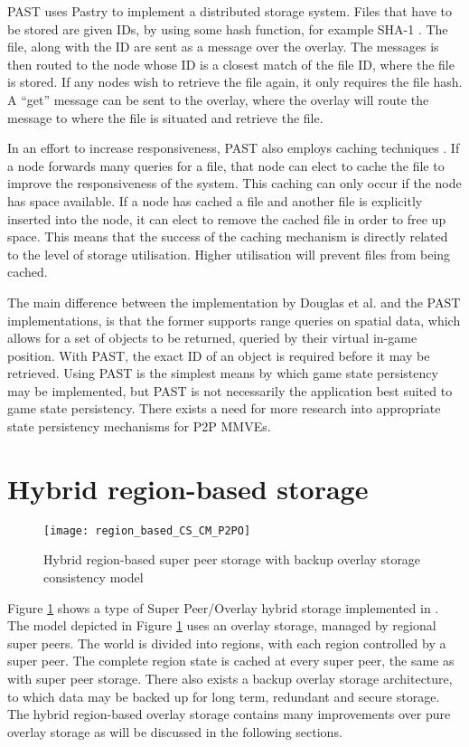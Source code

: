 PAST \cite{PAST_storage} uses Pastry to implement a distributed storage system. Files that have to be stored are given IDs, by using some hash
function, for example SHA-1 \cite{SHA}. The file, along with the ID are sent as a message over the overlay. The messages is then routed to the node
whose ID is a closest match of the file ID, where the file is stored. If any nodes wish to retrieve the file again, it only requires the file hash. A
``get'' message can be sent to the overlay, where the overlay will route the message to where the file is situated and retrieve the file.

In an effort to increase responsiveness, PAST also employs caching techniques \cite{storage_and_chaching_PAST}. If a node forwards many queries for a
file, that node can elect to cache the file to improve the responsiveness of the system. This caching can only occur if the node has space available.
If a node has cached a file and another file is explicitly inserted into the node, it can elect to remove the cached file in order to free up space.
This means that the success of the caching mechanism is directly related to the level of storage utilisation. Higher utilisation will prevent files
from being cached.

The main difference between the implementation by Douglas et al. and the PAST implementations, is that the former supports range queries on spatial
data, which allows for a set of objects to be returned, queried by their virtual in-game position. With PAST, the exact ID of an object is required
before it may be retrieved. Using PAST is the simplest means by which game state persistency may be implemented, but PAST is not necessarily the
application best suited to game state persistency. There exists a need for more research into appropriate state persistency mechanisms for P2P MMVEs.

\section{Hybrid region-based storage}
\label{hybrid_storage}

\begin{figure}[htbp]
 \centering
 \texttt{[image: region\_based\_CS\_CM\_P2PO]}
 \caption{Hybrid region-based super peer storage with backup overlay storage consistency model}
 \label{fig_cs_region_o_cm}
\end{figure}
%
Figure \ref{fig_cs_region_o_cm} shows a type of Super Peer/Overlay hybrid storage implemented in \cite{zoned_federation}. The model depicted in
Figure \ref{fig_cs_region_o_cm} uses an overlay storage, managed by regional super peers. The world is divided into regions, with each region
controlled by a super peer. The complete region state is cached at every super peer, the same as with super peer storage. There also exists a backup
overlay storage architecture, to which data may be backed up for long term, redundant and secure storage. The hybrid region-based overlay storage
contains many improvements over pure overlay storage as will be discussed in the following sections.

